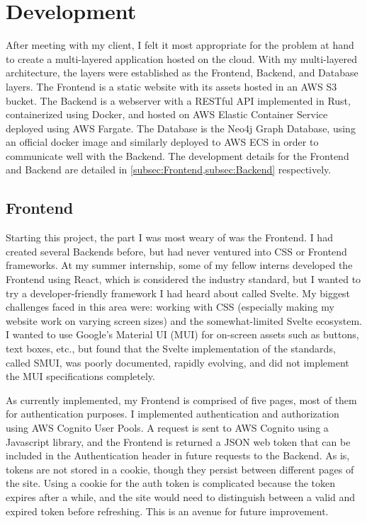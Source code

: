 \documentclass[advisory-ia.tex]{subfiles}
\begin{document}
  \section{Development}
  \label{sec:develop}
  After meeting with my client, I felt it most appropriate for the problem at hand to create a multi-layered application hosted on the cloud.
  With my multi-layered architecture, the layers were established as the Frontend, Backend, and Database layers.
  The Frontend is a static website with its assets hosted in an AWS S3 bucket.
  The Backend is a webserver with a RESTful API implemented in Rust, containerized using Docker, and hosted on AWS Elastic Container Service deployed using AWS Fargate.
  The Database is the Neo4j Graph Database, using an official docker image and similarly deployed to AWS ECS in order to communicate well with the Backend.
  The development details for the Frontend and Backend are detailed in \cref{subsec:Frontend,subsec:Backend} respectively.

  \subsection{Frontend}
  \label{subsec:Frontend}
  Starting this project, the part I was most weary of was the Frontend.
  I had created several Backends before, but had never ventured into CSS or Frontend frameworks.
  At my summer internship, some of my fellow interns developed the Frontend using React, which is considered the industry standard, but I wanted to try a developer-friendly framework I had heard about called Svelte.
  My biggest challenges faced in this area were: working with CSS (especially making my website work on varying screen sizes) and the somewhat-limited Svelte ecosystem.
  I wanted to use Google's Material UI (MUI) for on-screen assets such as buttons, text boxes, etc., but found that the Svelte implementation of the standards, called SMUI, was poorly documented, rapidly evolving, and did not implement the MUI specifications completely.

  As currently implemented, my Frontend is comprised of five pages, most of them for authentication purposes.
  I implemented authentication and authorization using AWS Cognito User Pools.
  A request is sent to AWS Cognito using a Javascript library, and the Frontend is returned a JSON web token that can be included in the Authentication header in future requests to the Backend.
  As is, tokens are not stored in a cookie, though they persist between different pages of the site.
  Using a cookie for the auth token is complicated because the token expires after a while, and the site would need to distinguish between a valid and expired token before refreshing.
  This is an avenue for future improvement.
\end{document}
